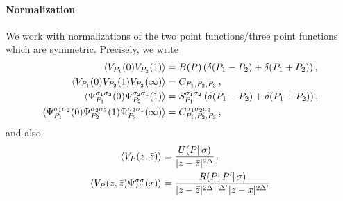 \documentclass[a4paper]{article}
\begin{document}
\paragraph{Normalization} We work with normalizations of the two point functions/three point functions which are symmetric. Precisely, we write
\begin{equation}\label{eq:Normalizations}
\begin{aligned}
  \braket{V_{P_1}(0)V_{P_2}(1)}&=B(P)\, (\delta(P_1-P_2)+\delta(P_1+P_2))\,,\\
  \braket{V_{P_1}(0)V_{P_2}(1)V_{P_3}(\infty)}&= C_{P_1,P_2,P_3}\,,\\
  \braket{\Psi_{P_1}^{\sigma_1 \sigma_2}(0)\Psi_{P_2}^{\sigma_2 \sigma_1}(1)}&= S_{P_1}^{\sigma_1 \sigma_2}\, (\delta(P_1-P_2)+\delta(P_1+P_2))\,,\\
  \braket{\Psi_{P_1}^{\sigma_1 \sigma_2}(0)\Psi_{P_2}^{\sigma_2 \sigma_3}(1)\Psi_{P_3}^{\sigma_3 \sigma_1}(\infty)} &= C_{P_1,P_2,P_3}^{\sigma_1 \sigma_2 \sigma_3}\,,\\
\end{aligned}
\end{equation}
and also 
\begin{equation}\label{eq:Normalizationsbis}
\begin{aligned}
  \braket{V_{P}(z,\bar{z})}&=\frac{U(P|\,\sigma)}{|z-\bar{z}|^{2\Delta}}\,.\\
  \braket{V_{P}(z,\bar{z})\Psi_{P'}^{\sigma \sigma}(x)}&=\frac{R(P;P'|\,\sigma)}{|z-\bar{z}|^{2\Delta -\Delta'}|z-x|^{2\Delta'}}
\end{aligned}
\end{equation}
\end{document}
